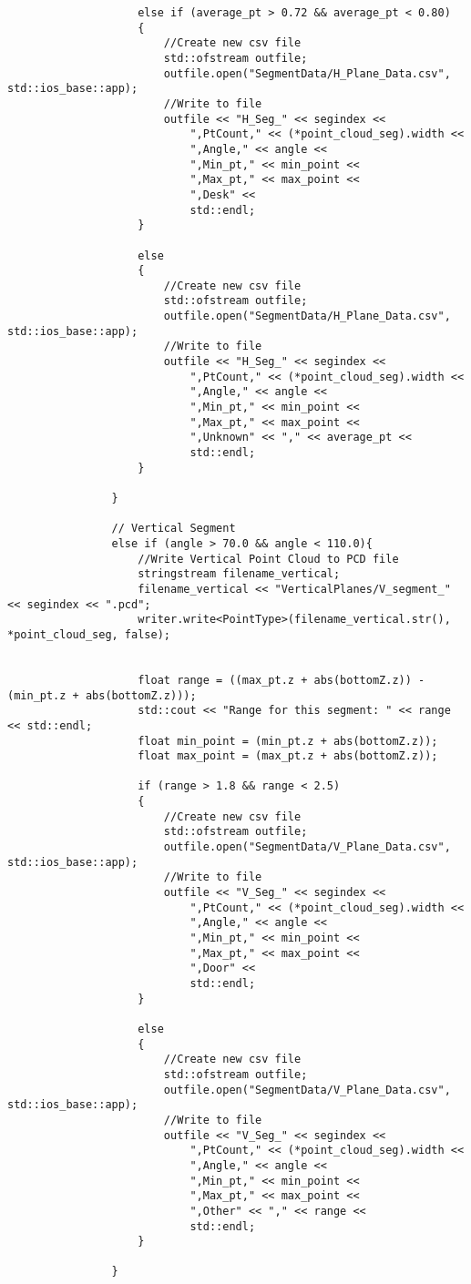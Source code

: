 \begin{lstlisting}
					else if (average_pt > 0.72 && average_pt < 0.80)
					{
						//Create new csv file
						std::ofstream outfile;
						outfile.open("SegmentData/H_Plane_Data.csv", std::ios_base::app);
						//Write to file
						outfile << "H_Seg_" << segindex <<
							",PtCount," << (*point_cloud_seg).width <<
							",Angle," << angle <<
							",Min_pt," << min_point <<
							",Max_pt," << max_point <<
							",Desk" <<
							std::endl;
					}

					else
					{
						//Create new csv file
						std::ofstream outfile;
						outfile.open("SegmentData/H_Plane_Data.csv", std::ios_base::app);
						//Write to file
						outfile << "H_Seg_" << segindex <<
							",PtCount," << (*point_cloud_seg).width <<
							",Angle," << angle <<
							",Min_pt," << min_point <<
							",Max_pt," << max_point <<
							",Unknown" << "," << average_pt <<
							std::endl;
					}

				}

				// Vertical Segment
				else if (angle > 70.0 && angle < 110.0){
					//Write Vertical Point Cloud to PCD file
					stringstream filename_vertical;
					filename_vertical << "VerticalPlanes/V_segment_" << segindex << ".pcd";
					writer.write<PointType>(filename_vertical.str(), *point_cloud_seg, false);


					float range = ((max_pt.z + abs(bottomZ.z)) - (min_pt.z + abs(bottomZ.z)));
					std::cout << "Range for this segment: " << range << std::endl;
					float min_point = (min_pt.z + abs(bottomZ.z));
					float max_point = (max_pt.z + abs(bottomZ.z));

					if (range > 1.8 && range < 2.5)
					{
						//Create new csv file
						std::ofstream outfile;
						outfile.open("SegmentData/V_Plane_Data.csv", std::ios_base::app);
						//Write to file
						outfile << "V_Seg_" << segindex <<
							",PtCount," << (*point_cloud_seg).width <<
							",Angle," << angle <<
							",Min_pt," << min_point <<
							",Max_pt," << max_point <<
							",Door" <<
							std::endl;
					}

					else
					{
						//Create new csv file
						std::ofstream outfile;
						outfile.open("SegmentData/V_Plane_Data.csv", std::ios_base::app);
						//Write to file
						outfile << "V_Seg_" << segindex <<
							",PtCount," << (*point_cloud_seg).width <<
							",Angle," << angle <<
							",Min_pt," << min_point <<
							",Max_pt," << max_point <<
							",Other" << "," << range <<
							std::endl;
					}

				}


\end{lstlisting}
